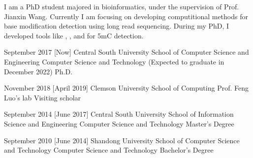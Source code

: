 \documentclass{resume}
\begin{document}
\makeheader

{\onehalfspacing\hspace{2em}%
I am a PhD student majored in bioinformatics, under the supervision of Prof. Jianxin Wang. Currently I am focusing on developing computitional methods for base modification detection using long read sequencing. During my PhD, I developed tools like , , and  for 5mC detection.
\par}

\begin{competences}[10em]
\end{competences}

\begin{educations}
  \education%
    {September 2017}%
    [Now]%
    {Central South University}%
    {School of Computer Science and Engineering}%
    {Computer Science and Technology (Expected to graduate in December 2022)}%
    {Ph.D.}

  \separator{0.5ex}
  \education%
    {November 2018}%
    [April 2019]%
    {Clemson University}%
    {School of Computing}%
    {Prof. Feng Luo's lab}%
    {Visiting scholar}

  \separator{0.5ex}
  \education%
    {September 2014}%
    [June 2017]%
    {Central South University}%
    {School of Information Science and Engineering}%
    {Computer Science and Technology}%
    {Master's Degree}

  \separator{0.5ex}
  \education%
    {September 2010}%
    [June 2014]%
    {Shandong University}%
    {School of Computer Science and Technology}%
    {Computer Science and Technology}%
    {Bachelor's Degree}
\end{educations}
\end{document}
